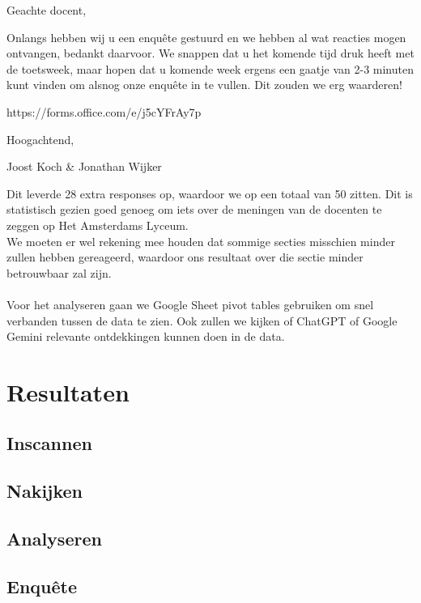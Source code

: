 \documentclass[12pt]{article}
\begin{document}
\begin{multicols}{2}
{\begin{minipage}{\linewidth}
Geachte docent,

Onlangs hebben wij u een enquête gestuurd en we hebben al wat reacties mogen ontvangen, bedankt daarvoor.
We snappen dat u het komende tijd druk heeft met de toetsweek, maar hopen dat u komende week ergens een gaatje van 2-3 minuten kunt vinden om alsnog onze enquête in te vullen. Dit zouden we erg waarderen!
 
https://forms.office.com/e/j5cYFrAy7p


Hoogachtend,
 
Joost Koch & Jonathan Wijker
\end{minipage}}
Dit leverde 28 extra responses op, waardoor we op een totaal van 50 zitten. Dit is statistisch gezien goed genoeg om iets over de meningen van de docenten te zeggen op Het Amsterdams Lyceum. \\
We moeten er wel rekening mee houden dat sommige secties misschien minder zullen hebben gereageerd, waardoor ons resultaat over die sectie minder betrouwbaar zal zijn.\\
\\
Voor het analyseren gaan we Google Sheet pivot tables gebruiken om snel verbanden tussen de data te zien. Ook zullen we kijken of ChatGPT of Google Gemini relevante ontdekkingen kunnen doen in de data. 


\end{multicols}



\section{Resultaten}
\subsection{Inscannen}

\subsection{Nakijken}

\subsection{Analyseren}

\subsection{Enquête}
\end{document}
